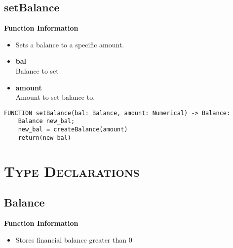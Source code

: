 \clearpage

\subsection{setBalance}
\textbf{Function Information}
\begin{itemize}
	\setlength{\itemsep}{5pt}
	\setlength{\parskip}{0pt}
	\setlength{\parsep}{0pt}
	\item Sets a balance to a specific amount.
	\item \textbf{bal} \\ Balance to set
	\item \textbf{amount} \\ Amount to set balance to.
\end{itemize}

\begin{verbatim}
FUNCTION setBalance(bal: Balance, amount: Numerical) -> Balance:
	Balance new_bal;
	new_bal = createBalance(amount)
	return(new_bal)
\end{verbatim}


\section{\textsc{Type Declarations}}

\subsection{Balance}
\textbf{Function Information}
\begin{itemize}
	\setlength{\itemsep}{5pt}
	\setlength{\parskip}{0pt}
	\setlength{\parsep}{0pt}
	\item Stores financial balance greater than 0
\end{itemize}

